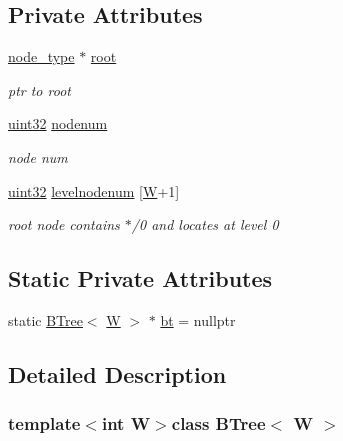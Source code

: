 \subsection*{Private Attributes}
\begin{DoxyCompactItemize}
\item 
\hyperlink{classBTree_a6868250b9b4cb60d672f2c83be3889f4}{node\-\_\-type} $\ast$ \hyperlink{classBTree_a813c0a8e677ed4e0dd3a49da8031782b}{root}
\begin{DoxyCompactList}\small\item\em ptr to root \end{DoxyCompactList}\item 
\hyperlink{types_8h_abd01e8e67e3d94cab04ecaaf4f85ac1b}{uint32} \hyperlink{classBTree_a2a4d4cc686f03e8685f5271484385772}{nodenum}
\begin{DoxyCompactList}\small\item\em node num \end{DoxyCompactList}\item 
\hyperlink{types_8h_abd01e8e67e3d94cab04ecaaf4f85ac1b}{uint32} \hyperlink{classBTree_add8631b7a3146b921cc78e9c462b6ca0}{levelnodenum} \mbox{[}\hyperlink{test__u128_8cpp_ab21b528bc38899d04d3a7053e52fb797}{W}+1\mbox{]}
\begin{DoxyCompactList}\small\item\em root node contains $\ast$/0 and locates at level 0 \end{DoxyCompactList}\end{DoxyCompactItemize}
\subsection*{Static Private Attributes}
\begin{DoxyCompactItemize}
\item 
static \hyperlink{classBTree}{B\-Tree}$<$ \hyperlink{test__u128_8cpp_ab21b528bc38899d04d3a7053e52fb797}{W} $>$ $\ast$ \hyperlink{classBTree_abb6c1b3f9b49697267b44ed7769d83bb}{bt} = nullptr
\end{DoxyCompactItemize}


\subsection{Detailed Description}
\subsubsection*{template$<$int W$>$class B\-Tree$<$ W $>$}

